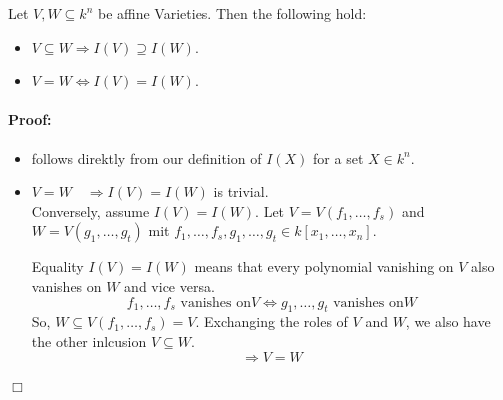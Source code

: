 \begin{proposition}[title = Proposition 1.4.11]
    Let $V,W \subseteq k^n$ be affine Varieties. Then the following hold: 
    \begin{itemize}
      \item[(i)] $V \subseteq W \Rightarrow I(V) \supseteq I(W)$. 
      \item[(ii)] $V = W \Leftrightarrow I(V) = I(W)$. 
    \end{itemize} 

    \paragraph{Proof:}  

    \begin{itemize}
      \item[(i)] follows direktly from our definition of $I(X)$ for a set $X \in k^n$. 
      \item[(ii)] $V = W \quad \Rightarrow I(V) = I(W)$ is trivial. \\
      
      Conversely, assume $I(V) = I(W)$. Let $V = V(f_1, \ldots, f_s)$ and $W = V(g_1, \ldots, g_t)$ mit $f_1, \ldots, f_s, g_1, \ldots, g_t \in k[x_1, \dots, x_n]$.

      Equality $I(V) = I(W)$ means that every polynomial vanishing on $V$ also vanishes on $W$ and vice versa. 
      \[f_1, \ldots, f_s \text{ vanishes on} V \Leftrightarrow g_1, \ldots, g_t \text{ vanishes on} W\] 
      So, $W \subseteq V(f_1, \ldots, f_s) = V$. Exchanging the roles of $V$ and $W$, we also have the other inlcusion $V \subseteq W$. 
      \[\Rightarrow V = W\]
    \end{itemize}
      \begin{flushright}
        $\Box $
      \end{flushright}
\end{proposition}

\begin{center}

\end{center}

